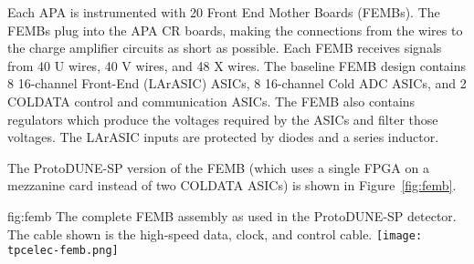 Each APA is instrumented with 20 Front End Mother Boards (FEMBs).
The FEMBs plug into the APA CR boards, making the connections from the wires to the charge amplifier circuits as short as possible.
Each FEMB receives signals from 40 U wires, 40 V wires, and 48 X wires.
The baseline FEMB design contains 8 16-channel Front-End (LArASIC) ASICs, 8 16-channel Cold ADC ASICs, and 2 COLDATA control and communication ASICs.
The FEMB also contains regulators which produce the voltages required by the ASICs and filter those voltages.
The LArASIC inputs are protected by diodes and a series inductor.
 
The ProtoDUNE-SP version of the FEMB (which uses a single FPGA on a mezzanine card instead of two COLDATA ASICs) is shown in Figure~\ref{fig:femb}.

\begin{dunefigure}
{fig:femb}
{The complete FEMB assembly as used in the ProtoDUNE-SP detector. The cable shown is the high-speed data, clock, and control cable.}
\texttt{[image: tpcelec-femb.png]}
\end{dunefigure}

